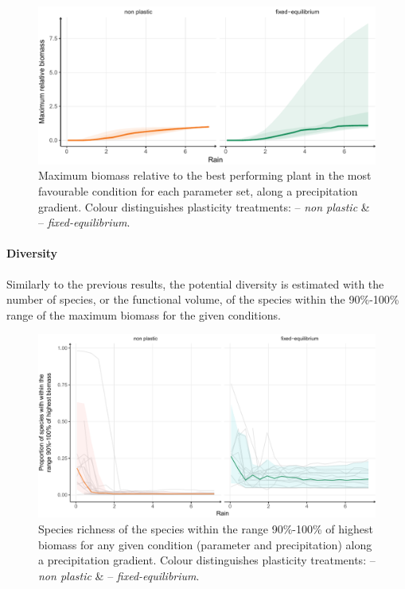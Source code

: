\begin{figure}\label{fig:maximum_BM}
\includegraphics[width = \textwidth]{./2_PP/Figures/Rain/gradient_rel_BM_pl_trend.pdf}
\caption[Maximum biomass relative along a precipitation gradient]{Maximum biomass relative to the best performing plant in the most favourable condition for each parameter set, along a precipitation gradient.  Colour distinguishes plasticity treatments: \textcolor{myOrange}{-- \textit{non plastic}} \&  \textcolor{myGreen}{-- \textit{fixed-equilibrium}}.}
\end{figure}


\paragraph{Diversity}

Similarly to the previous results, the potential diversity is estimated with the number of species, or the functional volume, of the species within the 90\%-100\% range of the maximum biomass for the given conditions.

\begin{figure}\label{fig:species_richness_grad}
\includegraphics[width = \textwidth]{./2_PP/Figures/Rain/gradient_plot_spdiv10.pdf}
\caption[Species richness of the best performing species along a precipitation gradient]{Species richness of the species within the range 90\%-100\% of highest biomass for any given condition (parameter and precipitation) along a precipitation gradient.  Colour distinguishes plasticity treatments: \textcolor{myOrange}{-- \textit{non plastic}} \&  \textcolor{myGreen}{-- \textit{fixed-equilibrium}}.} \end{figure}

